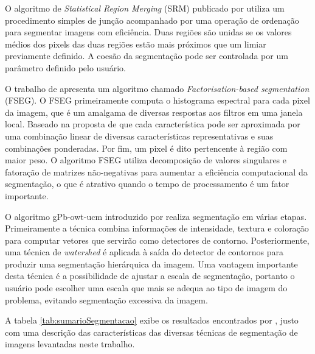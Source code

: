 O algoritmo de \textit{Statistical Region Merging} (SRM) publicado por  utiliza um procedimento simples de junção acompanhado por uma operação de ordenação para segmentar imagens com eficiência. Duas regiões são unidas se os valores médios dos pixels das duas regiões estão mais próximos que um limiar previamente definido. A coesão da segmentação pode ser controlada por um parâmetro definido pelo usuário.

O trabalho de  apresenta um algoritmo chamado \textit{Factorisation-based segmentation} (FSEG). O FSEG primeiramente computa o histograma espectral para cada pixel da imagem, que é um amalgama de diversas respostas aos filtros em uma janela local. Baseado na proposta de que cada característica pode ser aproximada por uma combinação linear de diversas características representativas e suas combinações ponderadas. Por fim, um pixel é dito pertencente à região com maior peso. O algoritmo FSEG utiliza decomposição de valores singulares e fatoração de matrizes não-negativas para aumentar a eficiência computacional da segmentação, o que é atrativo quando o tempo de processamento é um fator importante.

O algoritmo gPb-owt-ucm introduzido por  realiza segmentação em várias etapas. Primeiramente a técnica combina informações de intensidade, textura e coloração para computar vetores que servirão como  detectores de contorno. Posteriormente, uma técnica de \textit{watershed} é aplicada à saída do detector de contornos para produzir uma segmentação hierárquica da imagem. Uma vantagem importante desta técnica é a possibilidade de ajustar a escala de segmentação, portanto o usuário pode escolher uma escala que mais se adequa ao tipo de imagem do problema, evitando segmentação excessiva da imagem.

A tabela \ref{tab:sumarioSegmentacao} exibe os resultados encontrados por , justo com uma descrição das características das diversas técnicas de segmentação de imagens levantadas neste trabalho.

